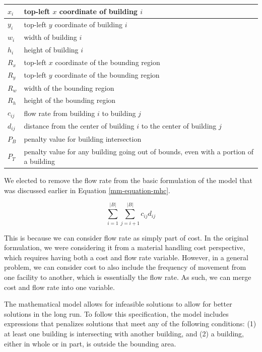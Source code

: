 \begin{center}
	\begin{tabular}{| l | p{10cm} |}
	\hline
	$x_{i}$  & top-left $x$ coordinate of building $i$ \\
	\hline
	$y_{i}$  & top-left $y$ coordinate of building $i$ \\
	\hline
	$w_{i}$  & width of building $i$ \\
	\hline
	$h_{i}$  & height of building $i$ \\
	\hline
	$R_{x}$  & top-left $x$ coordinate of the bounding region \\
	\hline
	$R_{y}$  & top-left $y$ coordinate of the bounding region \\
	\hline
	$R_{w}$  & width of the bounding region \\
	\hline
	$R_{h}$  & height of the bounding region \\
	\hline
	$c_{ij}$ & flow rate from building $i$ to building $j$ \\
	\hline
	$d_{ij}$ & distance from the center of building $i$ to the
	           center of building $j$ \\
	\hline
	$P_{B}$  & penalty value for building intersection \\
	\hline
	$P_{T}$  & penalty value for any building going out of
	           bounds, even with a portion of a building \\
	\hline
	\end{tabular}
\end{center}

We elected to remove the flow rate from the basic formulation of the model that was discussed earlier in Equation \ref{mm-equation-mhc}. 

\begin{equation}\label{mm-equation-mhc}
	\sum_{i=1}^{\left | B \right |}\sum_{j=i + 1}^{\left | B \right |}c_{ij}d_{ij}
\end{equation}

This is because we can consider flow rate as simply part of cost. In the original formulation, we were considering it from a material handling cost perspective, which requires having both a cost and flow rate variable. However, in a general problem, we can consider cost to also include the frequency of movement from one facility to another, which is essentially the flow rate. As such, we can merge cost and flow rate into one variable.

The mathematical model allows for infeasible solutions to allow for better solutions in the long run. To follow this specification, the model includes expressions that penalizes solutions that meet any of the following conditions: (1) at least one building is intersecting with another building, and (2) a building, either in whole or in part, is outside the bounding area.

